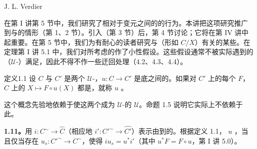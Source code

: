 \begin{center}J. L. Verdier\end{center}

在第 I 讲第 5 节中，我们研究了相对于变元之间的的行为。本讲把这项研究推广到与的情形（第 1、2 节）。引入（第 3 节）后，第 4 节讨论；它将在第 IV 讲中起重要。在第 5 节中，我们为有耐心的读者研究与（形如 $C/X$）有关的某些。在定理第 I 讲 5.1 中，我们对所考虑的作了小性假设。这些假设通常不被实际遇到的（$\mathcal U$-）满足，因此不得不作一些迂回处理（4.2、4.3、4.4）。

\begin{SGAresult}{定义}{1.1}
设 $C$ 与 $C'$ 是两个 $\mathcal U$-，$u:C\to C'$ 是底之间的。如果对 $C'$ 上的每个 $F$，$C$ 上的 $X\mapsto F\circ u(X)$ 都是，就称 $u$ 。
\end{SGAresult}
这个概念先验地依赖于使这两个成为 $\mathcal U$-的 $\mathcal U$。命题 1.5 说明它实际上不依赖于此。

\textbf{1.11。}用 $i:C^{\sim}\to\widehat C$（相应地 $i':C'^{\sim}\to\widehat {C'}$）表示由到的。根据定义 1.1， $u$ ，当且仅当存在 $u_s:C'^{\sim}\to C^{\sim}$，使得 $iu_s=u^*i'$（其中 $u^*F=F\circ u$，第 I 讲 5.0）。

